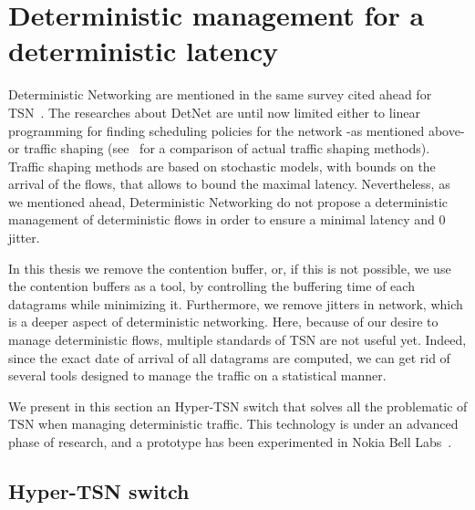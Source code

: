 \section{Deterministic management for a deterministic latency}
\label{sec:platform}


Deterministic Networking are mentioned in the same survey cited ahead for TSN~\cite{8458130}. The researches about DetNet are until now limited either to linear programming for finding scheduling policies for the network -as mentioned above- or traffic shaping (see~\cite{7092358} for a comparison of actual traffic shaping methods). Traffic shaping methods are based on stochastic models, with bounds on the arrival of the flows, that allows to bound the maximal latency. Nevertheless, as we mentioned ahead, Deterministic Networking do not propose a deterministic management of deterministic flows in order to ensure a minimal latency and $0$ jitter.

In this thesis we remove the contention buffer, or, if this is not possible, we use the contention buffers as a tool, by controlling the buffering time of each datagrams while minimizing it. Furthermore, we remove jitters in network, which is a deeper aspect of deterministic networking.
Here, because of our desire to manage deterministic flows, multiple standards of TSN are not useful yet. Indeed, since the exact date of arrival of all datagrams are computed, we can get rid of several tools designed to manage the traffic on a statistical manner. 

We present in this section an Hyper-TSN switch that solves all the problematic of TSN when managing deterministic traffic.
This technology is under an advanced phase of research, and a prototype has been experimented in Nokia Bell Labs~\cite{guiraudleclercmarce2021}.

\subsection{Hyper-TSN switch}


